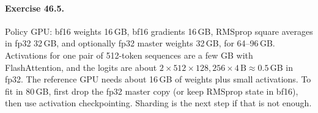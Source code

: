 \paragraph{Exercise 46.5.} Policy GPU: bf16 weights 16\,GB, bf16 gradients 16\,GB, RMSprop square
averages in fp32 32\,GB, and optionally fp32 master weights 32\,GB, for 64--96\,GB. Activations for
one pair of 512-token sequences are a few GB with FlashAttention, and the logits are about
$2\times512\times128{,}256\times4\,\text{B}\approx0.5$\,GB in fp32. The reference GPU needs about 16\,GB of
weights plus small activations. To fit in 80\,GB, first drop the fp32 master copy (or keep RMSprop
state in bf16), then use activation checkpointing. Sharding is the next step if that is not enough.
